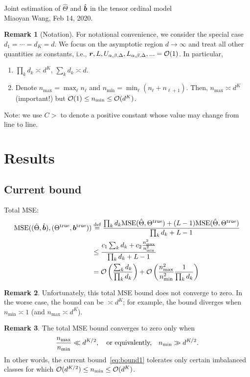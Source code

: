 \documentclass[11pt]{article}
\theoremstyle{plain}
\theoremstyle{definition}
\newtheorem{rmk}{Remark}
\begin{document}
\begin{center}
{\large Joint estimation of $\hat \Theta$ and $\hat {\bm{b}}$ in the tensor ordinal model}\\
\vspace{.1cm}
Miaoyan Wang, Feb 14, 2020. 
\end{center}
\begin{rmk}[Notation]
For notational convenience, we consider the special case $d_1=\cdots=d_K=d$. We focus on the asymptotic region $d\to \infty$ and treat all other quantities as constants, i.e., $\bm{r}, L, U_{\alpha,\beta,\Delta}, L_{\alpha,\beta,\Delta},...=\mathcal{O}(1)$. In particular, 
\begin{enumerate}
\item $\prod_k d_k \asymp d^K$, $\sum_k d_k\asymp d$. 
\item Denote $n_{\max}=\max_\ell n_{\ell}$ and $n_{\min}=\min_\ell(n_\ell+n_{\ell+1})$. Then, $n_{\max}\asymp d^K$ (important!) but $\mathcal{O}(1)\leq n_{\min}\leq \mathcal{O}(d^K)$. 
\end{enumerate}
Note: we use $C>$ to denote a positive constant whose value may change from line to line. 
\end{rmk}

\section{Results}
\subsection{Current bound}
Total MSE:
\begin{align}\label{eq:bound1}
\text{MSE}((\hat \Theta,\hat {\bm{b}}), (\Theta^{\mathrm{true}},\bm{b}^{\mathrm{true}}))&\stackrel{\text{def}}{=}{\prod_k d_k \mathrm{MSE}(\hat \Theta, \Theta^{\mathrm{true}})+(L-1)\mathrm{MSE}(\hat \Theta, \Theta^{\mathrm{true}}) \over \prod_k d_k+L-1} \notag \\
&\leq {c_1\sum_k d_k + c_2  {n^2_{\max} \over n^2_{\min}} \over \prod_k d_k+L-1} \notag \\
&=\mathcal{O}\left({\sum_k d_k\over \prod_k d_k}\right)+\mathcal{O}\left({n^2_{\max} \over n^2_{\min}} {1\over \prod_k d_k}\right)
\end{align}


\begin{rmk}
Unfortunately, this total MSE bound does not converge to zero. In the worse case, the bound can be $\asymp d^K$;  for example, the bound diverges when $n_{\min}\asymp 1$ (and $n_{\max}\asymp d^K$). 
\end{rmk}
\begin{rmk}
The total MSE bound converges to zero only when 
\begin{equation}\label{eq:1}
{n_{\max}\over n_{\min}}\ll d^{K/2},\quad \text{or equivalently,}\quad n_{\min} \gg d^{K/2}.
\end{equation}
In other words, the current bound~\eqref{eq:bound1} tolerates only certain imbalanced classes for which $\mathcal{O}(d^{K/2})\leq n_{\min}\leq \mathcal{O}(d^K)$. 
\end{rmk}
\end{document}
